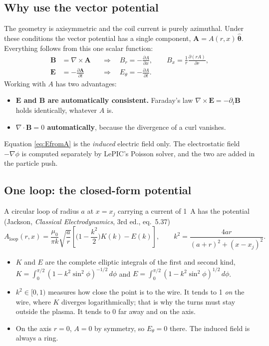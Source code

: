 \documentclass[11pt,a4paper]{article}
\begin{document}
\subsection{Why use the vector potential}

The geometry is axisymmetric and the coil current is purely azimuthal.
Under these conditions the vector potential has a single component,
$\mathbf A = A(r,x)\,\hat{\boldsymbol\theta}$. Everything follows from this
one scalar function:
\begin{align}
  \mathbf B &= \nabla\times\mathbf A
    &&\Rightarrow\quad
    B_r = -\frac{\partial A}{\partial x},\qquad
    B_x = \frac{1}{r}\frac{\partial (rA)}{\partial r}, \label{eq:curl}\\
  \mathbf E &= -\frac{\partial\mathbf A}{\partial t}
    &&\Rightarrow\quad E_\theta = -\frac{\partial A}{\partial t}. \label{eq:EfromA}
\end{align}
Working with $A$ has two advantages:
\begin{itemize}
  \item \textbf{$\mathbf{E}$ and $\mathbf{B}$ are automatically
        consistent.} Faraday's law
        $\nabla\times\mathbf E = -\partial_t\mathbf B$ holds identically,
        whatever $A$ is.
  \item \textbf{$\nabla\cdot\mathbf B = 0$ automatically}, because the
        divergence of a curl vanishes.
\end{itemize}
Equation \eqref{eq:EfromA} is the \emph{induced} electric field only. The
electrostatic field $-\nabla\phi$ is computed separately by LePIC's Poisson
solver, and the two are added in the particle push.

\subsection{One loop: the closed-form potential}

A circular loop of radius $a$ at $x = x_j$ carrying a current of
\SI{1}{A} has the potential (Jackson, \emph{Classical Electrodynamics},
3rd ed., eq.~5.37)
\begin{equation}
  A_{\mathrm{loop}}(r,x) = \frac{\mu_0}{\pi k}\sqrt{\frac{a}{r}}
  \left[\Big(1-\frac{k^2}{2}\Big)K(k) - E(k)\right],
  \qquad
  k^2 = \frac{4ar}{(a+r)^2 + (x-x_j)^2}.
  \label{eq:loop}
\end{equation}
\begin{itemize}
  \item $K$ and $E$ are the complete elliptic integrals of the first and
        second kind,
        $K = \int_0^{\pi/2}\! (1-k^2\sin^2\phi)^{-1/2}\,d\phi$ and
        $E = \int_0^{\pi/2}\! (1-k^2\sin^2\phi)^{1/2}\,d\phi$.
  \item $k^2\in[0,1)$ measures how close the point is to the wire. It tends
        to 1 \emph{on} the wire, where $K$ diverges logarithmically; that is
        why the turns must stay outside the plasma. It tends to 0 far away
        and on the axis.
  \item On the axis $r=0$, $A=0$ by symmetry, so $E_\theta = 0$ there. The
        induced field is always a ring.
\end{itemize}
\end{document}
